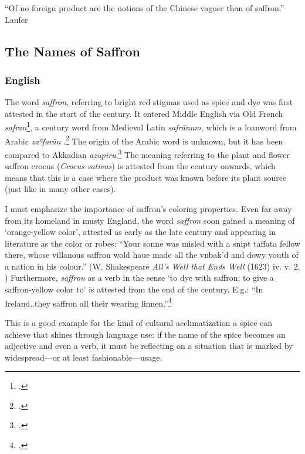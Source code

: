 ``Of no foreign product are the notions of the Chinese vaguer than
of saffron.'' Laufer

\subsection{The Names of Saffron}
\label{sec:names_of_saffron}

\subsubsection{English}



The word \textit{saffron}, referring to  bright red stigmas used as spice and dye was first attested in the start of the  century. It entered Middle English via Old French \textit{safran}\footcite[safran ]{tlfi}, a  century word from Medieval Latin \textit{safrānum}, which is a loanword from Arabic \textit{zaʿfarān} .\footcites[saffron]{oed}[saf(f)rǒun]{med} The origin of the Arabic word is unknown, but it has been compared to Akkadian \textit{azupīru}.\footcite[saffron ]{ahd} The meaning referring to the plant and flower saffron crocus (\textit{Crocus sativus}) is attested from the  century onwards, which means that this is a case where the product was known before its plant source (just like in many other cases).

I must emphasize the importance of saffron's coloring properties. Even far away from its homeland in musty England, the word \textit{saffron} soon gained a meaning of `orange-yellow color', attested as early as the late  century and appearing in literature as the color or robes: ``Your sonne was misled with a snipt taffata fellow there, whose villanous saffron wold haue made all the vnbak'd and dowy youth of a nation in his colour.'' (W. Shakespeare \textit{All's Well that Ends Well} (1623) iv. v. 2, \cite[saffron]{oed}) Furthermore, \textit{saffron} as a verb in the sense `to dye with saffron; to give a saffron-yellow color to' is attested from the end of the  century. E.g.: ``In Ireland..they saffron all their wearing linnen.''\footcite[saffron, v.]{oed}

This is a good example for the kind of cultural acclimatization a spice can achieve that shines through language use: if the name of the spice becomes an adjective and even a verb, it must be reflecting on a situation that is marked by widespread---or at least fashionable---usage.

